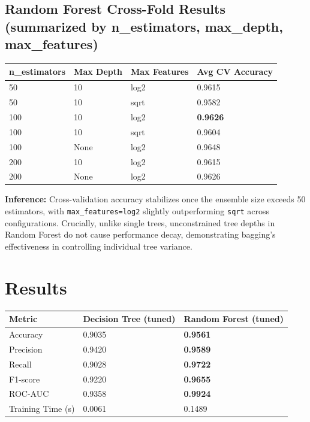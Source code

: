\documentclass[12pt,a4paper]{article}
\begin{document}
\subsection*{Random Forest Cross-Fold Results (summarized by n\_estimators, max\_depth, max\_features)}
\begin{longtable}{|p{2.3cm}|p{2.3cm}|p{2.7cm}|p{3cm}|}
\hline
\textbf{n\_estimators} & \textbf{Max Depth} & \textbf{Max Features} & \textbf{Avg CV Accuracy} \\ \hline
\endhead
50 & 10 & log2 & 0.9615 \\ \hline
50 & 10 & sqrt & 0.9582 \\ \hline
100 & 10 & log2 & \textbf{0.9626} \\ \hline
100 & 10 & sqrt & 0.9604 \\ \hline
100 & None & log2 & 0.9648 \\ \hline
200 & 10 & log2 & 0.9615 \\ \hline
200 & None & log2 & 0.9626 \\ \hline
\end{longtable}
\textbf{Inference:} Cross-validation accuracy stabilizes once the ensemble size exceeds 50 estimators, with \texttt{max\_features=log2} slightly outperforming \texttt{sqrt} across configurations. Crucially, unlike single trees, unconstrained tree depths in Random Forest do not cause performance decay, demonstrating bagging's effectiveness in controlling individual tree variance.

\section{Results}

\begin{longtable}{|p{4.5cm}|p{2.3cm}|p{2.3cm}|}
\hline
\textbf{Metric} & \textbf{Decision Tree (tuned)} & \textbf{Random Forest (tuned)} \\ \hline
\endhead
Accuracy & 0.9035 & \textbf{0.9561} \\ \hline
Precision & 0.9420 & \textbf{0.9589} \\ \hline
Recall & 0.9028 & \textbf{0.9722} \\ \hline
F1-score & 0.9220 & \textbf{0.9655} \\ \hline
ROC-AUC & 0.9358 & \textbf{0.9924} \\ \hline
Training Time (s) & 0.0061 & 0.1489 \\ \hline
\end{longtable}
\end{document}
